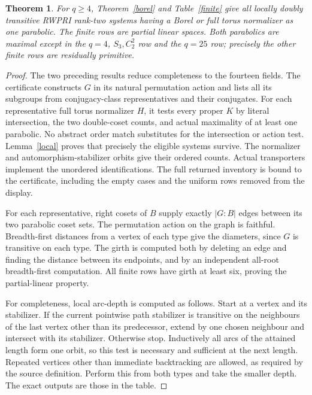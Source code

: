 \documentclass[11pt,a4paper]{article}
\newtheorem{theorem}{Theorem}\newtheorem{lemma}[theorem]{Lemma}
\begin{document}
\begin{theorem}\label{main}
For $q\ge4$, Theorem~\ref{borel} and Table~\ref{finite} give all locally
doubly transitive RWPRI rank-two systems having a Borel or full torus
normalizer as one parabolic. The finite rows are partial linear spaces.
Both parabolics are maximal except in the $q=4$, $S_3,C_2^2$ row and
the $q=25$ row; precisely the other finite rows are residually primitive.
\end{theorem}
\begin{proof}
The two preceding results reduce completeness to the fourteen fields.
The certificate constructs $G$ in its natural permutation action and lists
all its subgroups from conjugacy-class representatives and their conjugates.
For each representative full torus normalizer $H$, it tests every proper
$K$ by literal intersection, the two double-coset counts, and actual maximality
of at least one parabolic. No abstract order match substitutes for the
intersection or action test. Lemma~\ref{local} proves that precisely the
eligible systems survive. The normalizer and automorphism-stabilizer orbits
give their ordered counts. Actual transporters implement the unordered
identifications. The full returned inventory is bound to the certificate,
including the empty cases and the uniform rows removed from the display.

For each representative, right cosets of $B$ supply exactly $|G:B|$ edges
between its two parabolic coset sets. The permutation action on the graph
is faithful. Breadth-first distances from a vertex of each type give the
diameters, since $G$ is transitive on each type. The girth is computed both
by deleting an edge and finding the distance between its endpoints, and by
an independent all-root breadth-first computation. All finite rows have
girth at least six, proving the partial-linear property.

For completeness, local arc-depth is computed as follows. Start at a vertex
and its stabilizer. If the current pointwise path stabilizer is transitive
on the neighbours of the last vertex other than its predecessor, extend by
one chosen neighbour and intersect with its stabilizer. Otherwise stop.
Inductively all arcs of the attained length form one orbit, so this test is
necessary and sufficient at the next length. Repeated vertices other than
immediate backtracking are allowed, as required by the source definition.
Perform this from both types and take the smaller depth. The exact outputs
are those in the table.
\end{proof}
\end{document}

